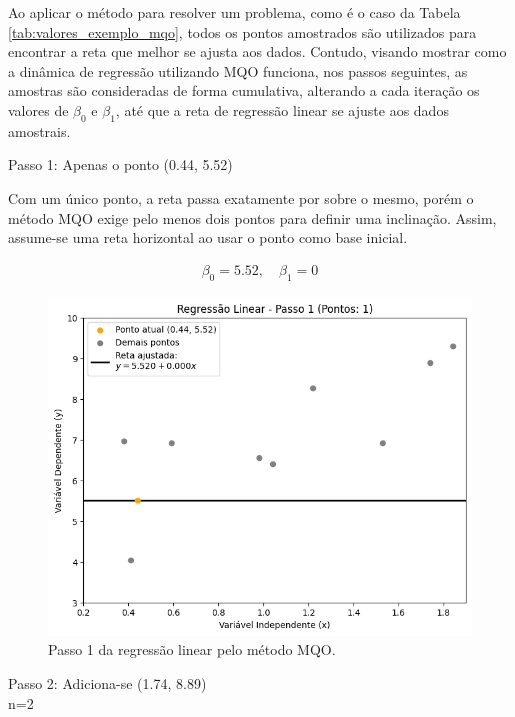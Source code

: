 Ao aplicar o método para resolver um problema, como é o caso da Tabela \ref{tab:valores_exemplo_mqo}, todos os pontos amostrados são utilizados para encontrar a reta que melhor se ajusta aos dados. Contudo, visando mostrar como a dinâmica de regressão utilizando MQO funciona, nos passos seguintes, as amostras são consideradas de forma cumulativa, alterando a cada iteração os valores de $\beta_0$ e $\beta_1$, até que a reta de regressão linear se ajuste aos dados amostrais.

Passo 1: Apenas o ponto (0.44, 5.52)

Com um único ponto, a reta passa exatamente por sobre o mesmo, porém o método MQO exige pelo menos dois pontos para definir uma inclinação. Assim, assume-se uma reta horizontal ao usar o ponto como base inicial.

\begin{gather*}
	\beta_0 = 5.52, \quad \beta_1 = 0
\end{gather*}


\begin{figure}[H]
	\caption{\label{fig:mqo_1}Passo 1 da regressão linear pelo método MQO.}
	\begin{center}
		\includegraphics[scale=0.5]{figuras/RL_step_1.png}
	\end{center}
\end{figure}

Passo 2: Adiciona-se (1.74, 8.89)
\\
n=2

